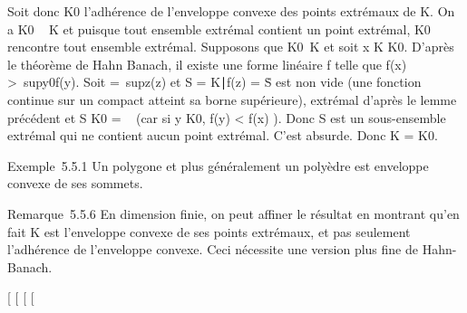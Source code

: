 Soit donc K0 l'adhérence de l'enveloppe convexe des points
extrémaux de K. On a K0 \subset~ K et puisque tout ensemble extrémal
contient un point extrémal, K0 rencontre tout ensemble
extrémal. Supposons que K0\neq~K et
soit x \in K \diagdown K0. D'après le théorème de Hahn Banach, il existe
une forme linéaire f telle que f(x)
\textgreater{}\
supy\inK0f(y). Soit \mu =\
supz\inKf(z) et S = \z \in
K∣f(z) = \mu\. S est non vide
(une fonction continue sur un compact atteint sa borne supérieure),
extrémal d'après le lemme précédent et S \bigcap K0 = \varnothing~ (car si y \in
K0, f(y) \textless{} f(x) \leq \mu). Donc S est un sous-ensemble
extrémal qui ne contient aucun point extrémal. C'est absurde. Donc K =
K0.

Exemple~5.5.1 Un polygone et plus généralement un polyèdre est enveloppe
convexe de ses sommets.

Remarque~5.5.6 En dimension finie, on peut affiner le résultat en
montrant qu'en fait K est l'enveloppe convexe de ses points extrémaux,
et pas seulement l'adhérence de l'enveloppe convexe. Ceci nécessite une
version plus fine de Hahn-Banach.

{[}
{[}
{[}
{[}
